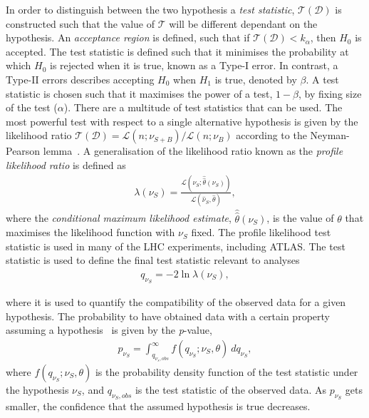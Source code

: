 In order to distinguish between the two hypothesis a \emph{test statistic}, $\mathcal{T}(\mathcal{D})$ is constructed such that the value of $\mathcal{T}$ will be different dependant on the hypothesis. An \emph{acceptance region} is defined, such that if $\mathcal{T}(\mathcal{D}) < k_\alpha$, then $H_0$ is accepted. The test statistic is defined such that it minimises the probability at which $H_0$ is rejected when it is true, known as a Type-I error. In contrast, a Type-II errors describes accepting $H_0$ when $H_1$ is true, denoted by $\beta$. A test statistic is chosen such that it maximises the power of a test, $1-\beta$, by fixing size of the test  ($\alpha$). There are a multitude of test statistics that can be used. The most powerful test with respect to a single alternative hypothesis is given by the likelihood ratio $\mathcal{T}(\mathcal{D}) = \mathcal{L}(n;\nu_{S+B})/\mathcal{L}(n;\nu_{B})$ according to the Neyman-Pearson lemma~\cite{Cowan1998}. A generalisation of the likelihood ratio known as the \emph{profile likelihood ratio} is defined as
\begin{equation}
    \label{eq:profLL}
    \begin{aligned}
        \lambda(\nu_S) = \frac{\mathcal{L}(\nu_S;\hat{\hat{\theta}}(\nu_S))}{\mathcal{L}(\hat{\nu}_S,\hat{\theta})},
    \end{aligned}
\end{equation}
where the \emph{conditional maximum likelihood estimate}, $\hat{\hat{\theta}}(\nu_S)$,  is the value of $\theta$ that maximises the likelihood function with $\nu_S$ fixed. The profile likelihood test statistic is used in many of the LHC experiments, including ATLAS. The test statistic is used to define the final test statistic relevant to analyses
\begin{equation}
    \label{eq:teststat}
    \begin{aligned}
        q_{\nu_S} = -2\ln\lambda(\nu_S),
    \end{aligned}
\end{equation}

where it is used to quantify the compatibility of the observed data for a given hypothesis. The probability to have obtained data with a certain property assuming a hypothesis~\cite{Cranmer:2015nia} is given by the \emph{p}-value, 
\begin{equation}
    \label{eq:pvalue}
    \begin{aligned}
        p_{\nu_S} = \int_{q_{\nu_{s},obs}}^\infty f(q_{\nu_S};\nu_S,\theta)~dq_{\nu_S},
    \end{aligned}
\end{equation}
where $f(q_{\nu_S};\nu_S,\theta)$ is the probability density function of the test statistic under the hypothesis $\nu_S$, and $q_{\nu_S,obs}$ is the test statistic of the observed data. As $p_{\nu_S}$ gets smaller, the confidence that the assumed hypothesis is true decreases. 

